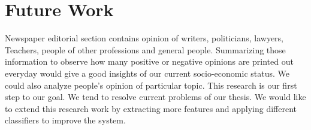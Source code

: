 \documentclass[a4paper,12pt]{report}
\begin{document}
\section{Future Work}
Newspaper editorial section contains opinion of writers, politicians, lawyers, Teachers, people of other professions and general people. Summarizing those information to observe how many positive or negative opinions are printed out  everyday would give a good insights of our current socio-economic status. We could also analyze people's opinion of particular topic. This research is our first step to our goal. We tend to resolve current problems of our thesis. We would like to extend this research work by extracting more features and applying different classifiers to improve the system.



\end{document}

